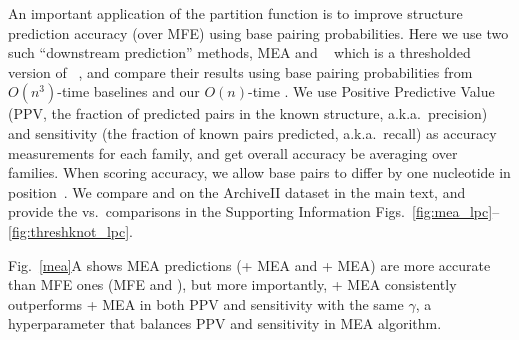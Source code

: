 An important application of the partition function
is to improve structure prediction accuracy (over MFE) using base pairing probabilities.
Here we use two such ``downstream prediction'' methods, MEA\cite{do+:2006} and \threshknot~\cite{Zhang+:2019} which is a thresholded version of \probknot~\cite{bellaousov+mathews:2010},
and compare their results using base pairing probabilities from $O(n^3)$-time baselines and our $O(n)$-time \linearpartition.
We use Positive Predictive Value (PPV, the fraction of predicted pairs in the known structure, a.k.a.~precision) 
and sensitivity (the fraction of known pairs predicted, a.k.a.~recall) 
as accuracy measurements for each family,
and get overall accuracy be averaging over families. 
When scoring accuracy, we allow base pairs to differ by one nucleotide in position~\cite{mathews+:1999}.
We compare \rnafold and \linearpartitionv on the ArchiveII dataset in the main text, and provide the \contrafold vs.~\linearpartitionc comparisons
in the Supporting Information Figs.~\ref{fig:mea_lpc}--\ref{fig:threshknot_lpc}.


Fig.~\ref{mea}A shows  
MEA predictions (\rnafold + MEA and \linearpartition + MEA) are more accurate than MFE ones (\rnafold MFE and \linearfoldv),
but more importantly,
\linearpartition + MEA  consistently outperforms \rnafold + MEA in both PPV and sensitivity
with the same $\gamma$, a hyperparameter that balances PPV and sensitivity in MEA algorithm.

